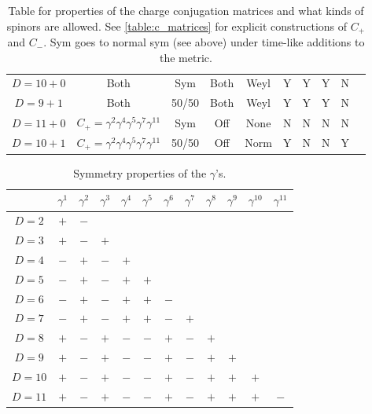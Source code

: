 \documentclass[11pt]{article}
\begin{document}
\begin{table}[H]
\begin{tabular}{|c|c|c|c|c|c|c|c|c|c|}
        $D = 10 + 0$ & Both & Sym & Both & Weyl & Y & Y & Y & N\\
        $D = 9 + 1$ & Both & 50/50 & Both & Weyl & Y & Y & Y & N\\
        $D = 11 + 0$ & $C_+ = \gamma^2 \gamma^4 \gamma^5 \gamma^7 \gamma^{11}$ & Sym & Off & None & N & N & N & N\\
        $D = 10 + 1$ & $C_+ = \gamma^2 \gamma^4 \gamma^5 \gamma^7 \gamma^{11}$ & 50/50 & Off & Norm & Y & N & N & Y\\
        \hline
    \end{tabular}
    \caption{Table for properties of the charge conjugation matrices
    and what kinds of spinors are allowed. See \ref{table:c_matrices}
    for explicit constructions of $C_+$ and $C_-$. Sym goes to
    normal sym (see above) under time-like additions to the metric.}
\end{table}

\begin{table}[H]
    \centering
    \begin{tabular}{|c|c|c|c|c|c|c|c|c|c|c|c|}
        \hline
         & $\gamma^1$ & $\gamma^2$ & $\gamma^3$ & $\gamma^4$ & $\gamma^5$ & $\gamma^6$ & $\gamma^7$ & $\gamma^8$ & $\gamma^9$ & $\gamma^{10}$ & $\gamma^{11}$ \\
        \hline
        $D = 2$  &  $+$  &  $-$  &     &     &     &     &     &     &     &     & \\ 
        $D = 3$  &  $+$  &  $-$  &  $+$  &     &     &     &     &     &     &     & \\
        $D = 4$  &  $-$  &  $+$  &  $-$  &  $+$  &     &     &     &     &     &     & \\
        $D = 5$  &  $-$  &  $+$  &  $-$  &  $+$  &  $+$  &     &     &     &     &     & \\
        $D = 6$  &  $-$  &  $+$  &  $-$  &  $+$  &  $+$  &  $-$  &     &     &     &     & \\
        $D = 7$  &  $-$  &  $+$  &  $-$  &  $+$  &  $+$  &  $-$  &  $+$  &     &     &     & \\
        $D = 8$  &  $+$  &  $-$  &  $+$  &  $-$  &  $-$  &  $+$  &  $-$  &  $+$  &     &     & \\
        $D = 9$  &  $+$  &  $-$  &  $+$  &  $-$  &  $-$  &  $+$  &  $-$  &  $+$  &  $+$  &     & \\
        $D = 10$ &  $+$  &  $-$  &  $+$  &  $-$  &  $-$  &  $+$  &  $-$  &  $+$  &  $+$  &  $+$  & \\
        $D = 11$ &  $+$  &  $-$  &  $+$  &  $-$  &  $-$  &  $+$  &  $-$  &  $+$  &  $+$  &  $+$  &  $-$  \\
        \hline
    \end{tabular}
    \caption{Symmetry properties of the $\gamma$'s.}
\end{table}
\end{document}
